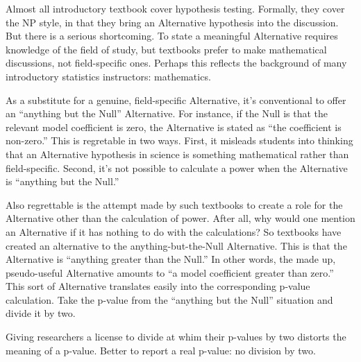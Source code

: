 \documentclass[
  letterpaper,
  DIV=11,
  numbers=noendperiod,
  oneside]{scrartcl}
\begin{document}
\begin{tcolorbox}[enhanced jigsaw, colbacktitle=quarto-callout-note-color!10!white, opacityback=0, breakable, opacitybacktitle=0.6, colback=white, coltitle=black, arc=.35mm, title=\textcolor{quarto-callout-note-color}{\faInfo}\hspace{0.5em}{The textbook version of the alternative hypothesis}, left=2mm, colframe=quarto-callout-note-color-frame, rightrule=.15mm, bottomrule=.15mm, leftrule=.75mm, bottomtitle=1mm, toptitle=1mm, titlerule=0mm, toprule=.15mm]

Almost all introductory textbook cover hypothesis testing. Formally,
they cover the NP style, in that they bring an Alternative hypothesis
into the discussion. But there is a serious shortcoming. To state a
meaningful Alternative requires knowledge of the field of study, but
textbooks prefer to make mathematical discussions, not field-specific
ones. Perhaps this reflects the background of many introductory
statistics instructors: mathematics.

As a substitute for a genuine, field-specific Alternative, it's
conventional to offer an ``anything but the Null'' Alternative. For
instance, if the Null is that the relevant model coefficient is zero,
the Alternative is stated as ``the coefficient is non-zero.'' This is
regretable in two ways. First, it misleads students into thinking that
an Alternative hypothesis in science is something mathematical rather
than field-specific. Second, it's not possible to calculate a power when
the Alternative is ``anything but the Null.''

Also regrettable is the attempt made by such textbooks to create a role
for the Alternative other than the calculation of power. After all, why
would one mention an Alternative if it has nothing to do with the
calculations? So textbooks have created an alternative to the
anything-but-the-Null Alternative. This is that the Alternative is
``anything greater than the Null.'' In other words, the made up,
pseudo-useful Alternative amounts to ``a model coefficient greater than
zero.'' This sort of Alternative translates easily into the
corresponding p-value calculation. Take the p-value from the ``anything
but the Null'' situation and divide it by two.

Giving researchers a license to divide at whim their p-values by two
distorts the meaning of a p-value. Better to report a real p-value: no
division by two.

\end{tcolorbox}
\end{document}
